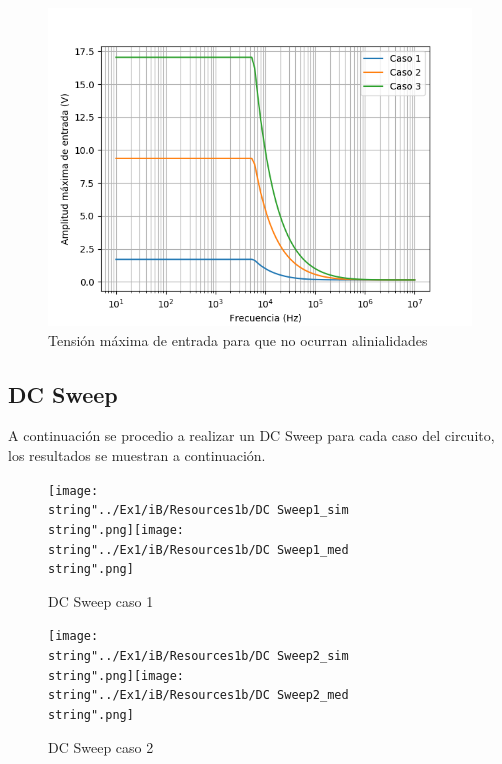 \begin{figure}[H]
\begin{centering}
\includegraphics[scale=0.5]{../Ex1/iB/Resources1b/AmplMaxVsFreq123}
\par\end{centering}
\caption{Tensión máxima de entrada para que no ocurran alinialidades}
\label{1_b_30}
\end{figure}

\subsection{DC Sweep}

A continuación se procedio a realizar un DC Sweep para cada caso del
circuito, los resultados se muestran a continuación.

\begin{figure}[H]
\begin{centering}
\texttt{[image: \\string"../Ex1/iB/Resources1b/DC Sweep1\_sim\\string".png]}\texttt{[image: \\string"../Ex1/iB/Resources1b/DC Sweep1\_med\\string".png]}
\par\end{centering}
\caption{DC Sweep caso 1}
\end{figure}

\begin{figure}[H]
\begin{centering}
\texttt{[image: \\string"../Ex1/iB/Resources1b/DC Sweep2\_sim\\string".png]}\texttt{[image: \\string"../Ex1/iB/Resources1b/DC Sweep2\_med\\string".png]}
\par\end{centering}
\caption{DC Sweep caso 2}
\end{figure}

